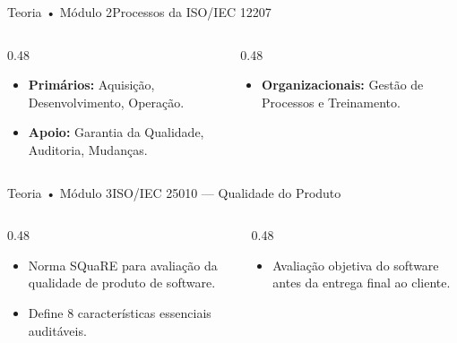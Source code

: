 \begin{senaiframe}{Teoria • Módulo 2}{Processos da ISO/IEC 12207}
  \begin{columns}[t]
    \begin{column}{0.48\textwidth}
      \begin{tcolorbox}[senaibluecard, title={Primários \& Apoio}]
        \begin{itemize}
          \item \textbf{Primários:} Aquisição, Desenvolvimento, Operação.
          \item \textbf{Apoio:} Garantia da Qualidade, Auditoria, Mudanças.
        \end{itemize}
      \end{tcolorbox}
    \end{column}
    \begin{column}{0.48\textwidth}
      \begin{tcolorbox}[senaiambercard, title={Organizacionais}]
        \begin{itemize}
          \item \textbf{Organizacionais:} Gestão de Processos e Treinamento.
        \end{itemize}
      \end{tcolorbox}
    \end{column}
  \end{columns}
\end{senaiframe}

\begin{senaiframe}{Teoria • Módulo 3}{ISO/IEC 25010 — Qualidade do Produto}
  \begin{columns}[t]
    \begin{column}{0.48\textwidth}
      \begin{tcolorbox}[senaibluecard, title={Evolução da ISO 9126}]
        \begin{itemize}
          \item Norma SQuaRE para avaliação da qualidade de produto de software.
          \item Define 8 características essenciais auditáveis.
        \end{itemize}
      \end{tcolorbox}
    \end{column}
    \begin{column}{0.48\textwidth}
      \begin{tcolorbox}[senaigreencard, title={Objetivo}]
        \begin{itemize}
          \item Avaliação objetiva do software antes da entrega final ao cliente.
        \end{itemize}
      \end{tcolorbox}
    \end{column}
  \end{columns}
\end{senaiframe}

